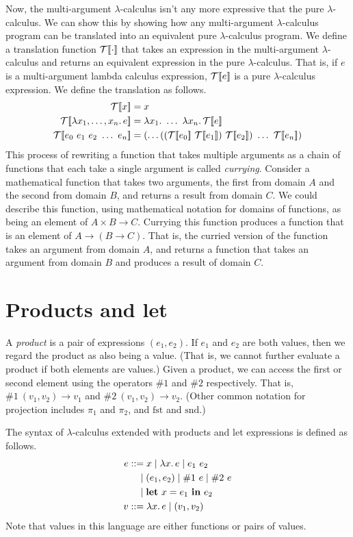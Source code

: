 Now, the multi-argument $\lambda$-calculus isn't any more expressive that the pure $\lambda$-calculus.
We can show this by showing how any multi-argument $\lambda$-calculus program can be translated into
an equivalent pure $\lambda$-calculus program. We define a translation function $\mathcal{T}[\![\cdot]\!]$ that
takes an expression in the multi-argument $\lambda$-calculus and returns an equivalent expression
in the pure $\lambda$-calculus. That is, if $e$ is a multi-argument lambda calculus expression,
$\mathcal{T}[\![e]\!]$ is a pure $\lambda$-calculus expression. We define the translation as follows.
\begin{align*}
  \tl{x}&=x\\
  \tl{\lambda x_1,\ldots,x_n.\,e}&=\lambda x_1.\ \ldots\ \lambda x_n.\,\tl{e}\\
  \tl{e_0\ e_1\ e_2\ \ldots\ e_n}&=(\ldots((\tl{e_0}\ \tl{e_1})\ \tl{e_2})\ \ldots\ \tl{e_n})
\end{align*}
This process of rewriting a function that takes multiple arguments as a chain of functions that
each take a single argument is called \emph{currying}. Consider a mathematical function that takes
two arguments, the first from domain $A$ and the second from domain $B$, and returns a result from
domain $C$. We could describe this function, using mathematical notation for domains of functions,
as being an element of $A\times B\to C$. Currying this function produces a function that is an
element of $A\to(B\to C)$. That is, the curried version of the function takes an argument from
domain $A$, and returns a function that takes an argument from domain $B$ and produces a result of
domain $C$.

\section{Products and let}

A \emph{product} is a pair of expressions $(e_1,e_2)$. If $e_1$ and $e_2$ are both values, then we
regard the product as also being a value. (That is, we cannot further evaluate a product if both
elements are values.) Given a product, we can access the first or second element using the
operators $\#1$ and $\#2$ respectively. That is, $\#1\ (v_1,v_2)\to v_1$ and
$\#2\ (v_1,v_2)\to v_2$. (Other common notation for projection includes $\pi_1$ and $\pi_2$, and
$\mathrm{fst}$ and $\mathrm{snd}$.)

The syntax of $\lambda$-calculus extended with products and let expressions is defined as follows.
\begin{align*}
  e&::=x\mid\lambda x.\,e\mid e_1\ e_2\\
  &\quad\mid(e_1,e_2)\mid\#1\ e\mid\#2\ e\\
  &\quad\mid\mathbf{let}\ x=e_1\ \mathbf{in}\ e_2\\
  v&::=\lambda x.\,e\mid(v_1,v_2)
\end{align*}
Note that values in this language are either functions or pairs of values.


